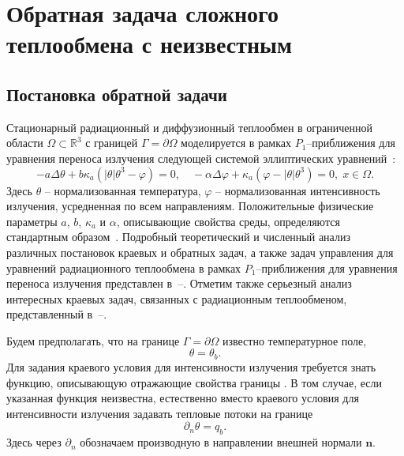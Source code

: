 \section{Обратная задача сложного теплообмена с неизвестным }\label{sec:ch2_sec2}

\subsection{Постановка обратной задачи}\label{subsec:2_1_init}

Стационарный радиационный и диффузионный теплообмен в
ограниченной области $\Omega\subset \mathbb{R}^3$ с границей
$\Gamma=\partial\Omega$ моделируется в рамках $P_1$--приближения для уравнения
переноса излучения следующей системой эллиптических уравнений~\cite{Pinnau07,AMC-13,Kovt14-1}:
\begin{equation}
    \label{eq1}
    - a\Delta\theta + b\kappa_a(|\theta|\theta^3- \varphi)=0,   \quad
    -\alpha \Delta \varphi + \kappa_a(\varphi-|\theta|\theta^3)=0,\; x\in\Omega.
\end{equation}
Здесь $\theta$ -- нормализованная температура, $\varphi$ --
нормализованная интенсивность излучения, усредненная по всем
направлениям.
Положительные физические параметры
$a$, $b$, $\kappa_a$ и $\alpha$, описывающие
свойства среды, определяются стандартным образом~\cite{Kovt14-1}.
Подробный теоретический и численный анализ различных постановок краевых и обратных задач, а также задач управления
для уравнений радиационного теплообмена
в рамках $P_1$--приближения для уравнения
переноса излучения представлен в~\cite{Pinnau07}--\cite{CMMP20}.
Отметим также серьезный анализ интересных краевых задач, связанных с радиационным теплообменом,
представленный в~\cite{Amosov05}--\cite{Amosov20}.

Будем предполагать, что на границе $\Gamma = \partial \Omega$ известно температурное поле,
\begin{equation}
    \label{bc1} \theta = \theta_b.
\end{equation}
Для задания краевого условия для интенсивности излучения
требуется знать функцию, описывающую отражающие свойства границы \cite{JVM-14}.
В том случае, если указанная функция неизвестна, естественно вместо
краевого условия для интенсивности излучения задавать тепловые потоки на границе
\begin{equation}
    \label{bc2} \partial_n\theta = q_b.
\end{equation}
Здесь через $\partial_n$ обозначаем производную в направлении
внешней нормали $\mathbf n$.

